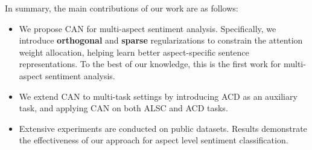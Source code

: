 \documentclass[11pt,a4paper]{article}
\begin{document}
In summary, the main contributions of our work are as follows:
\begin{itemize}
\vspace{-0.2cm}
\item We propose CAN for multi-aspect sentiment analysis. Specifically, we introduce {\bf orthogonal} and {\bf sparse} regularizations to constrain the attention weight allocation, helping learn better aspect-specific sentence representations. To the best of our knowledge, this is the first work for multi-aspect sentiment analysis.


\vspace{-0.2cm}
\item We extend CAN to multi-task settings by introducing ACD as an auxiliary task, and applying CAN on  both ALSC and ACD tasks. 

\vspace{-0.2cm}
\item Extensive experiments are conducted on public datasets. Results demonstrate the effectiveness of our approach for aspect level sentiment classification.  
\end{itemize}
\end{document}
